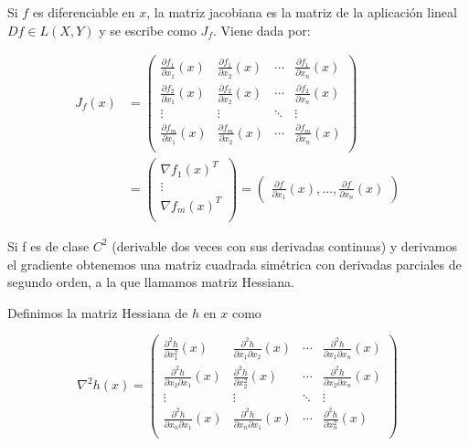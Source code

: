 \begin{definicion}
    Si $f$ es diferenciable en $ x$, la matriz jacobiana es la matriz de la aplicación lineal $Df \in L \left ( X, Y \right )$ y se escribe como $J_f$. Viene dada por:

 \begin{align*}
	J_f(x)&= \begin{pmatrix}
	 \frac{\partial f_1}{\partial x_1}(x) & \frac{\partial f_1}{\partial x_2}(x) & \cdots & \frac{\partial f_1}{\partial x_n}(x) \\
	 \frac{\partial f_2}{\partial x_1}(x) & \frac{\partial f_2}{\partial x_2}(x) & \cdots & \frac{\partial f_2}{\partial x_n}(x) \\
	 \vdots & \vdots & \ddots & \vdots \\
	 \frac{\partial f_m}{\partial x_1}(x) & \frac{\partial f_m}{\partial x_2}(x) & \cdots & \frac{\partial f_m}{\partial x_n}(x) \\
	\end{pmatrix} \\	
	&= \begin{pmatrix}
	 \nabla f_1(x)^T\\
	 \vdots \\
	 \nabla f_m(x)^T \\
	\end{pmatrix}=
	\begin{pmatrix}
	     \frac{\partial f}{\partial x_1}(x), \ldots, \frac{\partial f}{\partial x_n}(x)
	\end{pmatrix}
\end{align*}

\end{definicion}



Si f es de clase $C^2$ (derivable dos veces con sus derivadas continuas) y derivamos el gradiente obtenemos una matriz cuadrada simétrica con derivadas parciales de segundo orden, a la que llamamos matriz Hessiana.

\begin{definicion}
	Definimos la matriz Hessiana de $h$ en $x$ como

	$$\nabla^2h(x)= \begin{pmatrix}
		\frac{\partial^2h}{\partial x^{2}_1}(x) & \frac{\partial^2h}{\partial x_1\partial x_2}(x) & \cdots & \frac{\partial^2h}{\partial x_1 \partial x_n}(x)\\
		\frac{\partial^2h}{\partial x_2 \partial x_1}(x) & \frac{\partial^2h}{\partial x^{2}_2}(x) & \cdots & \frac{\partial^2h}{\partial x_2 \partial x_n}(x)\\
		\vdots & \vdots & \ddots & \vdots \\
		\frac{\partial^2h}{\partial x_n \partial x_1}(x) & \frac{\partial^2h}{\partial x_n \partial x_1}(x) & \cdots & \frac{\partial^2h}{\partial x^{2}_n}(x)\\
	\end{pmatrix}$$

\end{definicion}

